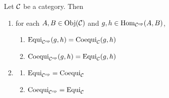 \documentclass{book}
\begin{document}
	\begin{ex}
		Let $\MC$ be a category. Then
		\begin{enumerate}
			\item for each $A,B \in \Obj(\MC)$ and $g,h \in \Hom_{\op{\MC}}(A,B)$, 
			\begin{enumerate}
				\item $\Eqzr_{\op{\MC}}(g, h) = \Coeqzr_{\MC}(g,h)$
				\item $\Coeqzr_{\op{\MC}}(g,h) = \Eqzr_{\MC}(g,h)$
			\end{enumerate}
			\item 
			\begin{enumerate}
				\item $\Eqzr_{\op{\MC}} = \Coeqzr_{\MC}$
				\item $\Coeqzr_{\op{\MC}} = \Eqzr_{\MC}$
			\end{enumerate}
		\end{enumerate}
	\end{ex}
	
\end{document}
